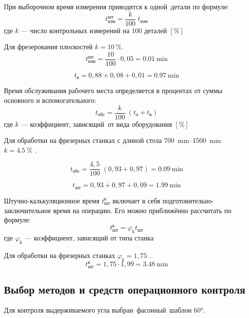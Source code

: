 \documentclass[14pt,russian,a4paper]{extreport}
\begin{document}
При выборочном время измерения приводится к одной детали по формуле:
\begin{equation*}
  t_\text{изм}^\text{шт} = \frac{k}{100} \; t_\text{изм}
\end{equation*}
где $k$ --- число контрольных измерений на 100 деталей $[\%]$

Для фрезерования плоскостей $ k = \SI{10}{\percent} $.
\begin{equation*}
  t_\text{изм}^\text{шт} = \frac{10}{100} \cdot 0,05 = \SI{0,01}{\minute}
\end{equation*}

\begin{equation*}
  t_\text{в} = 0,88 + 0,08 + 0,01 = \SI{0,97}{\minute}
\end{equation*}

Время обслуживания рабочего места определяется в процентах от суммы основного и вспомогательного: 
\begin{equation*}
  t_\text{обс} = \frac{k}{100} \; (t_\text{о} + t_\text{в})
\end{equation*}
где $k$ --- коэффициент, зависящий от вида оборудования $[\%]$

Для обработки на фрезерных станках с длиной стола \SIrange{700}{1500}{\milli\meter} $ k = \SI{4,5}{\percent} $ \cite[прил.~5]{malzen:normirovanie}.

\begin{equation*}
  t_\text{обс} = \frac{4,5}{100} \; (0,93 + 0,97) = \SI{0,09}{\minute}
\end{equation*}

\begin{equation*}
  t_\text{шт} = 0,93 + 0,97 + 0,09 = \SI{1,99}{\minute}
\end{equation*}

Штучно-калькуляционное время $t_\text{шт}^\text{к}$ включает в себя подготовительно-заключительное время на операцию. Его можно приближённо рассчитать по формуле: 
\begin{equation*}
  t_\text{шт}^\text{к} = \varphi_\text{k} t_\text{шт}
\end{equation*}
где $\varphi_\text{k}$ --- коэффициент, зависящий от типа станка

Для обработки на фрезерных станках $ \varphi_\text{k} = 1,75 $ \cite[прил.~7]{malzen:normirovanie}.
\begin{equation*}
  t_\text{шт}^\text{к} = 1,75 \cdot 1,99 = \SI{3,48}{\minute}
\end{equation*}


\subsection{Выбор методов и средств операционного контроля}
Для контроля выдерживаемого угла выбран фасонный шаблон $\ang{60}$.
\end{document}
